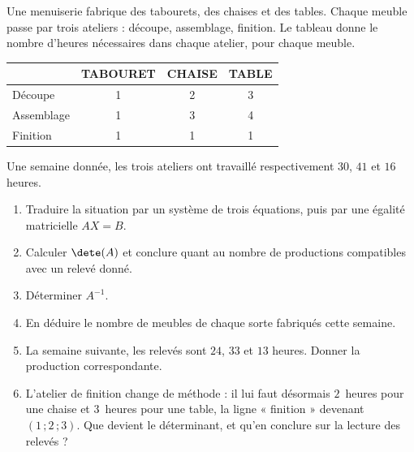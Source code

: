 \begin{jecherche}
Une menuiserie fabrique des tabourets, des chaises et des tables. Chaque
meuble passe par trois ateliers : découpe, assemblage, finition. Le tableau
donne le nombre d'heures nécessaires dans chaque atelier, pour chaque meuble.

\begin{center}
\setlength{\tabcolsep}{9pt}
\renewcommand{\arraystretch}{1.2}
\begin{tabular}{@{}lccc@{}}
\toprule
& \textsf{\footnotesize\bfseries TABOURET} & \textsf{\footnotesize\bfseries CHAISE}
& \textsf{\footnotesize\bfseries TABLE} \\
\midrule
Découpe    & 1 & 2 & 3 \\
Assemblage & 1 & 3 & 4 \\
Finition   & 1 & 1 & 1 \\
\bottomrule
\end{tabular}
\end{center}

Une semaine donnée, les trois ateliers ont travaillé respectivement $30$,
$41$ et $16$ heures.

\begin{enumerate}[label=\textbf{\arabic*.}, leftmargin=*, itemsep=0.3em]
  \item Traduire la situation par un système de trois équations, puis par une
        égalité matricielle $AX = B$.
  \item Calculer $\dete(A)$ et conclure quant au nombre de productions
        compatibles avec un relevé donné.
  \item Déterminer $A^{-1}$.
  \item En déduire le nombre de meubles de chaque sorte fabriqués cette
        semaine.
  \item La semaine suivante, les relevés sont $24$, $33$ et $13$ heures.
        Donner la production correspondante.
  \item L'atelier de finition change de méthode : il lui faut désormais
        $2$~heures pour une chaise et $3$~heures pour une table, la ligne
        « finition » devenant $(1\,;2\,;3)$. Que devient le déterminant, et
        qu'en conclure sur la lecture des relevés ?
\end{enumerate}
\end{jecherche}

